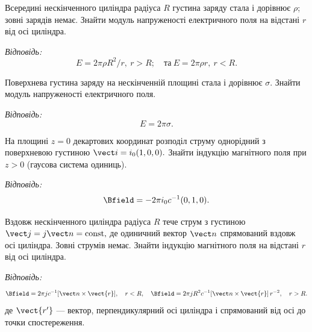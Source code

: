 \begin{problem}
	Всередині нескінченного циліндра радіуса \(R\) густина заряду стала і дорівнює \(\rho\); зовні зарядів немає. Знайти
	модуль напруженості електричного поля на відстані \(r\) від осі циліндра.

	\textit{Відповідь:}
	\[
		E = 2\pi\rho R^2/r,\ r > R; \quad \text{та}\
		E = 2\pi\rho r,\ r < R.
	\]
\end{problem}

\begin{problem}
	Поверхнева густина заряду на нескінченній площині стала і дорівнює \(\sigma\). Знайти модуль напруженості
	електричного поля.

	\textit{Відповідь:}
	\[
		E = 2\pi\sigma.
	\]
\end{problem}

\begin{problem}
	На площині \(z=0\) декартових координат розподіл струму однорідний з поверхневою густиною
	\(
	\vect i = i_0(1,0,0).
	\)
	Знайти індукцію магнітного поля при \(z>0\) (гаусова система одиниць).

	\textit{Відповідь:}
	\[
		\Bfield = -2\pi i_0 c^{-1}(0,1,0).
	\]
\end{problem}

\begin{problem}
	Вздовж нескінченного циліндра радіуса \(R\) тече струм з густиною
	\(
	\vect j = j \vect n = \text{const},
	\)
	де одиничний вектор \(\vect n\) спрямований вздовж осі циліндра. Зовні струмів немає. Знайти індукцію магнітного
	поля на відстані \(r\) від осі циліндра.

	\textit{Відповідь:}
	\begin{equation*}
		\Bfield = 2\pi j c^{-1} [\vect n \times \vect{r}], \quad r < R, \quad
		\Bfield = 2\pi j R^2 c^{-1} [\vect n \times \vect{r}]\, r^{-2}, \quad r > R.
	\end{equation*}
	де \(\vect{r'}\) --- вектор, перпендикулярний осі циліндра і спрямований від осі до точки спостереження.
\end{problem}